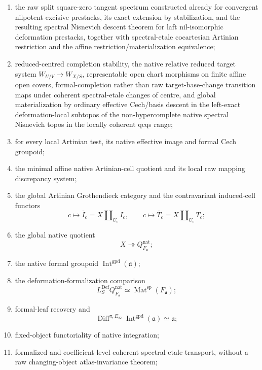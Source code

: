 \begin{enumerate}
    \item the raw split square-zero tangent spectrum constructed already for
    convergent nilpotent-excisive prestacks, its exact extension by
    stabilization, and the resulting spectral Nisnevich descent theorem for
    laft nil-isomorphic deformation prestacks, together with spectral-etale
    cocartesian Artinian restriction and the affine
    restriction/materialization equivalence;
    \item reduced-centred completion stability, the native relative reduced
    target system $W_{U/V}\to W_{X/S}$, representable open chart morphisms on
    finite affine open covers, formal-completion rather than raw
    target-base-change transition maps under coherent spectral-etale changes
    of centre, and global materialization by ordinary effective Cech/basis
    descent in the left-exact deformation-local subtopos of the
    non-hypercomplete native spectral Nisnevich topos in the locally coherent
    qcqs range;
    \item for every local Artinian test, its native effective image and formal
    Cech groupoid;
    \item the minimal affine native Artinian-cell quotient and its local raw
    mapping discrepancy system;
    \item the global Artinian Grothendieck category and the contravariant
    induced-cell functors
    \[
        c\longmapsto
        \overline I_c=X\amalg_{U_c}I_c,
        \qquad
        c\longmapsto
        \overline T_c=X\amalg_{U_c}T_c;
    \]
    \item the global native quotient
    \[
        X\twoheadrightarrow Q^{\mathrm{nat}}_{F_{\mathfrak a}};
    \]
    \item the native formal groupoid
    $\operatorname{Int}^{\mathrm{gpd}}(\mathfrak a)$;
    \item the deformation-formalization comparison
    \[
        L_S^{\mathrm{Def}}Q^{\mathrm{nat}}_{F_{\mathfrak a}}
        \simeq
        \operatorname{Mat}^{\mathrm{sp}}(F_{\mathfrak a});
    \]
    \item formal-leaf recovery and
    \[
        \operatorname{Diff}^{\pi,E_\infty}
        \operatorname{Int}^{\mathrm{gpd}}(\mathfrak a)
        \simeq
        \mathfrak a;
    \]
    \item fixed-object functoriality of native integration;
    \item formalized and coefficient-level coherent spectral-etale transport,
    without a raw changing-object atlas-invariance theorem;

\end{enumerate}
